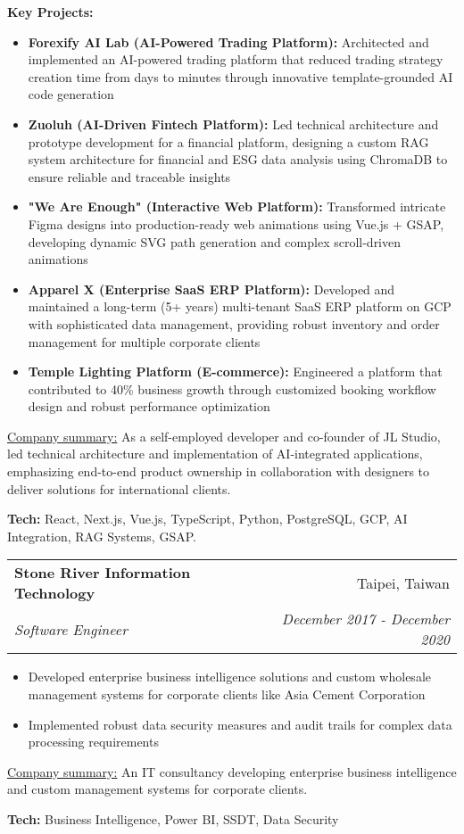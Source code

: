 \documentclass[letterpaper,11pt]{article}
\makeatletter
\newcommand{\resumeItem}[1]{%
  \item\small{
    #1
  }
}
\newcommand{\resumeSubheading}[4]{
  \vspace{8pt}\item%
    \begin{tabular*}{0.97\textwidth}[t]{l@{\extracolsep{\fill}}r}
      \textbf{#1} & #2 \\
      \textit{\small#3} & \textit{\small #4} \\
    \end{tabular*}\vspace{-5pt}
}
\newcommand{\resumeItemListStart}{\begin{itemize}}
\newcommand{\resumeItemListEnd}{\end{itemize}\vspace{-5pt}}
\newcommand{\resumeTech}[2]{
 \underline{#1:} #2
}
\makeatother
\begin{document}
      \vspace{5pt}
      \textbf{Key Projects:}
      \resumeItemListStart
      \resumeItem{\textbf{Forexify AI Lab (AI-Powered Trading Platform):} Architected and implemented an AI-powered trading platform that reduced trading strategy creation time from days to minutes through innovative template-grounded AI code generation}
      \resumeItem{\textbf{Zuoluh (AI-Driven Fintech Platform):} Led technical architecture and prototype development for a financial platform, designing a custom RAG system architecture for financial and ESG data analysis using ChromaDB to ensure reliable and traceable insights}
      \resumeItem{\textbf{"We Are Enough" (Interactive Web Platform):} Transformed intricate Figma designs into production-ready web animations using Vue.js + GSAP, developing dynamic SVG path generation and complex scroll-driven animations}
      \resumeItem{\textbf{Apparel X (Enterprise SaaS ERP Platform):} Developed and maintained a long-term (5+ years) multi-tenant SaaS ERP platform on GCP with sophisticated data management, providing robust inventory and order management for multiple corporate clients}
      \resumeItem{\textbf{Temple Lighting Platform (E-commerce):} Engineered a platform that contributed to 40\% business growth through customized booking workflow design and robust performance optimization}
      \resumeItemListEnd
      \resumeTech{Company summary}{As a self-employed developer and co-founder of JL Studio, led technical architecture and implementation of AI-integrated applications, emphasizing end-to-end product ownership in collaboration with designers to deliver solutions for international clients.}
      \begin{tcolorbox}
          \textbf{Tech:} React, Next.js, Vue.js, TypeScript, Python, PostgreSQL, GCP, AI Integration, RAG Systems, GSAP.
      \end{tcolorbox}

    \resumeSubheading
      {Stone River Information Technology}{Taipei, Taiwan}
      {Software Engineer}{December 2017 - December 2020}
      \resumeItemListStart
      \resumeItem{Developed enterprise business intelligence solutions and custom wholesale management systems for corporate clients like Asia Cement Corporation}
      \resumeItem{Implemented robust data security measures and audit trails for complex data processing requirements}
      \resumeItemListEnd
      \resumeTech{Company summary}{An IT consultancy developing enterprise business intelligence and custom management systems for corporate clients.}
      \begin{tcolorbox}
          \textbf{Tech:} Business Intelligence, Power BI, SSDT, Data Security
      \end{tcolorbox}
    
\end{document}
